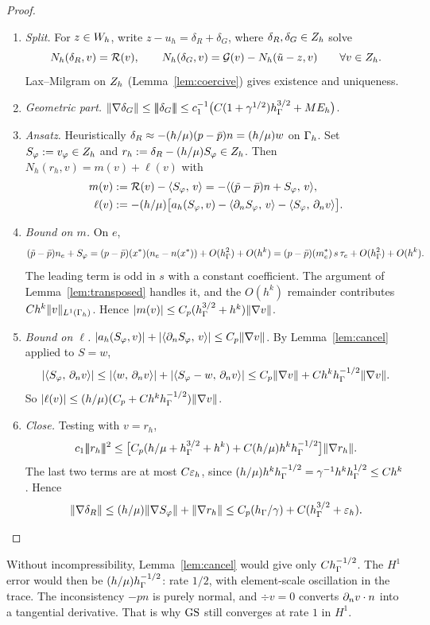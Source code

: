 \begin{proof}
\begin{enumerate}
\item \emph{Split.} For $z\in W_h$, write $z-u_h=\delta_R+\delta_G$, where $\delta_R,\delta_G\in Z_h$ solve
\[
N_h(\delta_R,v)=\mathcal R(v),\qquad N_h(\delta_G,v)=\mathcal G(v)-N_h(\tilde u-z,v)\qquad\forall v\in Z_h.
\]
Lax--Milgram on $Z_h$ (Lemma~\ref{lem:coercive}) gives existence and uniqueness.
\item \emph{Geometric part.} $\lVert \nabla\delta_G\rVert\le|\!|\!|\delta_G|\!|\!|\le c_1^{-1}\bigl(C(1+\gamma^{1/2})h_\Gamma^{3/2}+ME_h\bigr)$.
\item \emph{Ansatz.} Heuristically $\delta_R\approx-(h/\mu)(p-\bar p)n=(h/\mu)w$ on $\Gamma_h$. Set $S_\varphi:=v_\varphi\in Z_h$ and $r_h:=\delta_R-(h/\mu)S_\varphi\in Z_h$. Then $N_h(r_h,v)=m(v)+\ell(v)$ with
\begin{align*}
m(v)&:=\mathcal R(v)-\langle S_\varphi,\, v\rangle=-\langle (\tilde p-\bar p)n+S_\varphi,\, v\rangle,\\
\ell(v)&:=-(h/\mu)\bigl[a_h(S_\varphi,v)-\langle \partial_n S_\varphi,\, v\rangle-\langle S_\varphi,\, \partial_n v\rangle\bigr].
\end{align*}
\item \emph{Bound on $m$.} On $e$,
\[
(\tilde p-\bar p)n_e+S_\varphi=(p-\bar p)(x^\ast)(n_e-n(x^\ast))+O(h_\Gamma^2)+O(h^k)=(p-\bar p)(m_e^\ast)\,s\,\tau_e+O(h_\Gamma^2)+O(h^k).
\]
The leading term is odd in $s$ with a constant coefficient. The argument of Lemma~\ref{lem:transposed} handles it, and the $O(h^k)$ remainder contributes $Ch^k\lVert v\rVert_{L^1(\Gamma_h)}$. Hence $|m(v)|\le C_p(h_\Gamma^{3/2}+h^k)\lVert \nabla v\rVert$.
\item \emph{Bound on $\ell$.} $|a_h(S_\varphi,v)|+|\langle \partial_n S_\varphi,\, v\rangle|\le C_p\lVert \nabla v\rVert$. By Lemma~\ref{lem:cancel} applied to $S=w$,
\[
|\langle S_\varphi,\, \partial_n v\rangle|\le|\langle w,\, \partial_n v\rangle|+|\langle S_\varphi-w,\, \partial_n v\rangle|\le C_p\lVert \nabla v\rVert+Ch^kh_\Gamma^{-1/2}\lVert \nabla v\rVert.
\]
So $|\ell(v)|\le(h/\mu)(C_p+Ch^kh_\Gamma^{-1/2})\lVert \nabla v\rVert$.
\item \emph{Close.} Testing with $v=r_h$,
\[
c_1|\!|\!|r_h|\!|\!|^2\le\bigl[C_p(h/\mu+h_\Gamma^{3/2}+h^k)+C(h/\mu)h^kh_\Gamma^{-1/2}\bigr]\lVert \nabla r_h\rVert.
\]
The last two terms are at most $C\varepsilon_h$, since $(h/\mu)h^kh_\Gamma^{-1/2}=\gamma^{-1}h^kh_\Gamma^{1/2}\le Ch^k$. Hence
\[
\lVert \nabla\delta_R\rVert\le(h/\mu)\lVert \nabla S_\varphi\rVert+\lVert \nabla r_h\rVert\le C_p(h_\Gamma/\gamma)+C(h_\Gamma^{3/2}+\varepsilon_h).\qedhere
\]
\end{enumerate}
\end{proof}

\begin{remark}
Without incompressibility, Lemma~\ref{lem:cancel} would give only $Ch_\Gamma^{-1/2}$. The $H^1$ error would then be $(h/\mu)h_\Gamma^{-1/2}$: rate $1/2$, with element-scale oscillation in the trace. The inconsistency $-pn$ is purely normal, and $\div v=0$ converts $\partial_n v\cdot n$ into a tangential derivative. That is why $\mathrm{GS}$ still converges at rate $1$ in $H^1$.
\end{remark}


